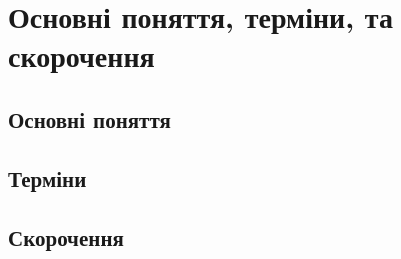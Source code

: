 \chapter{Основні поняття, терміни, та скорочення}
\section{Основні поняття}
\nopagebreak[4]



\pagebreak[3]

\section{Терміни}
\nopagebreak[4]



\pagebreak[3]

\section{Скорочення}
\nopagebreak[4]



\pagebreak[3]
